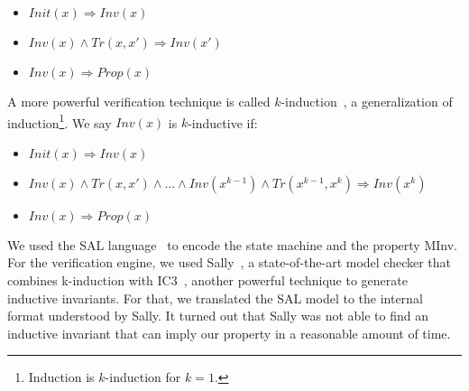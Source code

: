 \begin{itemize}
\item $Init(x) \Rightarrow Inv(x)$
\item $Inv(x) \wedge Tr(x,x') \Rightarrow Inv(x')$
\item $Inv(x) \Rightarrow Prop(x)$  
\end{itemize}




A more powerful verification technique is called
$k$-induction~\cite{MouraRS03}, a generalization of
induction\footnote{Induction is $k$-induction for $k=1$.}. We say
$Inv(x)$ is $k$-inductive if:

\begin{itemize}
\item $Init(x) \Rightarrow Inv(x)$
\item $Inv(x) \wedge Tr(x,x') \wedge \ldots \wedge Inv(x^{k-1}) \wedge Tr(x^{k-1},x^{k}) \Rightarrow Inv(x^{k})$
\item $Inv(x) \Rightarrow Prop(x)$    
\end{itemize}


We used the SAL language~\cite{bensalem2000overview,sal2} to encode
the state machine and the property \textsf{MInv}. For the verification
engine, we used Sally~\cite{sally}, a state-of-the-art model checker
that combines k-induction with IC3~\cite{Bradley11}, another powerful
technique to generate inductive invariants.  For that, we translated
the SAL model to the internal format understood by Sally.  It turned
out that Sally was not able to find an inductive invariant that can
imply our property in a reasonable amount of time.


